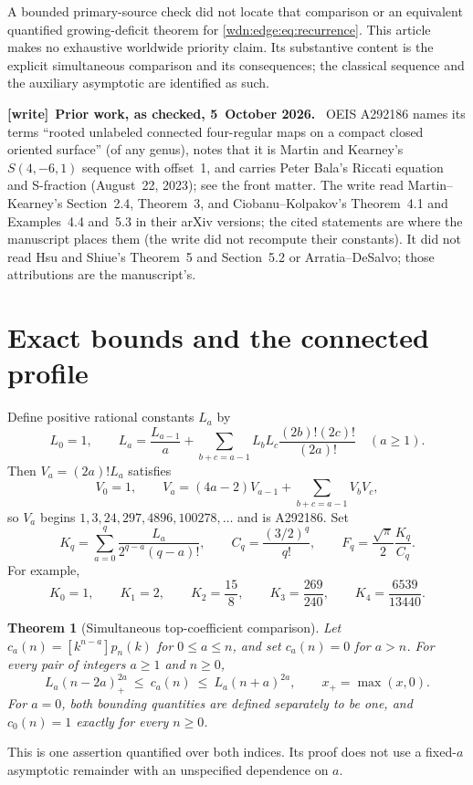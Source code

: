 \documentclass[11pt,letterpaper]{article}
\newtheorem{theorem}{Theorem}[section]
\theoremstyle{remark}\newtheorem{remark}[theorem]{Remark}
\newenvironment{writenote}[1][]{\par\smallskip\begingroup\small
 \noindent\textbf{[write]}\if\relax\detokenize{#1}\relax\else~\textbf{#1.}\fi\ }%
 {\par\endgroup\smallskip}
\begin{document}
A bounded primary-source check did not locate that comparison or an
equivalent quantified growing-deficit theorem for \eqref{wdn:edge:eq:recurrence}.
This article makes no exhaustive worldwide priority claim. Its substantive
content is the explicit simultaneous comparison and its consequences;
the classical sequence and the auxiliary asymptotic are identified as such.

\begin{writenote}[Prior work, as checked, 5~October 2026]
OEIS A292186 names its terms ``rooted unlabeled connected four-regular maps on a compact closed oriented surface'' (of any genus), notes that it is Martin and Kearney's $S(4,-6,1)$ sequence with offset~1, and carries Peter Bala's Riccati equation and S-fraction (August~22, 2023); see the front matter. The write read Martin--Kearney's Section~2.4, Theorem~3, and Ciobanu--Kolpakov's Theorem~4.1 and Examples~4.4 and~5.3 in their arXiv versions; the cited statements are where the manuscript places them (the write did not recompute their constants). It did not read Hsu and Shiue's Theorem~5 and Section~5.2 or Arratia--DeSalvo; those attributions are the manuscript's.
\end{writenote}

\section{Exact bounds and the connected profile}\label{wdn:edge:sec:results}
Define positive rational constants $L_a$ by
\begin{equation}\label{wdn:edge:eq:L}
 L_0=1,\qquad
 L_a=\frac{L_{a-1}}a+
 \sum_{b+c=a-1}L_bL_c\frac{(2b)!(2c)!}{(2a)!}\quad(a\ge1).
\end{equation}
Then $V_a=(2a)!L_a$ satisfies
\begin{equation}\label{wdn:edge:eq:V}
 V_0=1,\qquad
 V_a=(4a-2)V_{a-1}+\sum_{b+c=a-1}V_bV_c,
\end{equation}
so $V_a$ begins $1,3,24,297,4896,100278,\ldots$ and is A292186.
Set
\begin{equation}\label{wdn:edge:eq:profile}
 K_q=\sum_{a=0}^{q}\frac{L_a}{2^{q-a}(q-a)!},\qquad
 C_q=\frac{(3/2)^q}{q!},\qquad
 F_q=\frac{\sqrt\pi}{2}\frac{K_q}{C_q}.
\end{equation}
For example,
\[
 K_0=1,\qquad K_1=2,\qquad K_2=\frac{15}{8},\qquad
 K_3=\frac{269}{240},\qquad K_4=\frac{6539}{13440}.
\]

\begin{theorem}[Simultaneous top-coefficient comparison]\label{wdn:edge:thm:top}
Let $c_a(n)=[k^{n-a}]p_n(k)$ for $0\le a\le n$, and set $c_a(n)=0$
for $a>n$. For every pair of integers $a\ge1$ and $n\ge0$,
\begin{equation}\label{wdn:edge:eq:top}
 L_a(n-2a)_+^{2a}\ \le\ c_a(n)\ \le\ L_a(n+a)^{2a},
 \qquad x_+=\max(x,0).
\end{equation}
For $a=0$, both bounding quantities are defined separately to be one,
and $c_0(n)=1$ exactly for every $n\ge0$.
\end{theorem}
This is one assertion quantified over both indices. Its proof does not
use a fixed-$a$ asymptotic remainder with an unspecified dependence on $a$.
\end{document}
